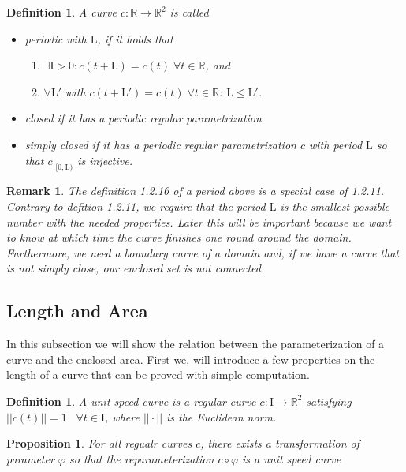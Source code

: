 \documentclass[a4paper]{book}
\newtheorem{remark}[theorem]{Remark}%
\newtheorem{proposition}[theorem]{Proposition}%
\newtheorem{definition}[theorem]{Definition}%
\numberwithin{theorem}{section}%
\begin{document}
\begin{definition}
    A curve $c:\mathbb{R}\to\mathbb{R}^{2}$ is called
    \begin{itemize}
        \item periodic with $\mathrm{L}$, if it holds that
        \begin{enumerate}
            \item $\exists\mathrm{I}>0: c(t+\mathrm{L})=c(t)\;\forall t\in\mathbb{R}$, and
            \item $\forall\mathrm{L}'$ with $c(t+\mathrm{L}')=c(t)\;\forall t\in\mathbb{R}$: $\mathrm{L}\leq\mathrm{L}'$.
        \end{enumerate}
        \item closed if it has a periodic regular parametrization
        \item simply closed if it has a periodic regular parametrization $c$ with period $\mathrm{L}$ so that $c|_{[0,\mathrm{L})}$ is injective.
    \end{itemize}
\end{definition}

\begin{remark}
    The definition 1.2.16 of a period above is a special case of 1.2.11. Contrary to defition 1.2.11, we require that the period $\mathrm{L}$ is the smallest possible number with the needed properties. Later this will be important because we want to know at which time the curve finishes one round around the domain. Furthermore, we need a boundary curve of a domain and, if we have a curve that is not simply close, our enclosed set is not connected.
\end{remark}

\subsection{Length and Area}
In this subsection we will show the relation between the parameterization of a curve and the enclosed area. First we, will introduce a few properties on the length of a curve that can be proved with simple computation.

\begin{definition}
    A unit speed curve is a regular curve $c:\mathrm{I}\to\mathbb{R}^2$ satisfying $||\dot{c}(t)||=1\;\;\;\forall t\in\mathrm{I}$, where $||\cdot||$ is the Euclidean norm.
\end{definition}

\begin{proposition}
    For all regualr curves $c$, there exists a transformation of parameter $\varphi$ so that the reparameterization $c\circ\varphi$ is a unit speed curve
\end{proposition}
\end{document}
